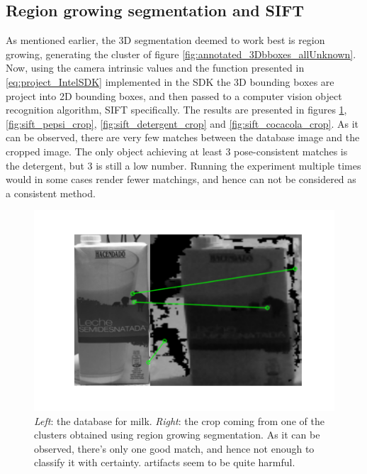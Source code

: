 \documentclass[../main.tex]{subfiles}
\begin{document}
\subsection{Region growing segmentation and SIFT}
As mentioned earlier, the 3D segmentation deemed to work best is region growing, generating the cluster of figure \ref{fig:annotated_3Dbboxes_allUnknown}. Now, using the camera intrinsic values and the function presented in \ref{eq:project_IntelSDK} implemented in the SDK the 3D bounding boxes are project into 2D bounding boxes, and then passed to a computer vision object recognition algorithm, SIFT specifically. The results are presented in figures \ref{fig:sift_milk_crop}, \ref{fig:sift_pepsi_crop}, \ref{fig:sift_detergent_crop} and \ref{fig:sift_cocacola_crop}. As it can be observed, there are very few matches between the database image and the cropped image. The only object achieving at least 3 pose-consistent matches is the detergent, but 3 is still a low number. Running the experiment multiple times would in some cases render fewer matchings, and hence can not be considered as a consistent method.

\begin{figure}[H]
    \centering
    \includegraphics[width=0.7\linewidth]{images/sift_milk_crop.png}
    \caption{\emph{Left}: the database for milk. \emph{Right}: the crop coming from one of the clusters obtained using region growing segmentation. As it can be observed, there's only one good match, and hence not enough to classify it with certainty. artifacts seem to be quite harmful.}
    \label{fig:sift_milk_crop}
\end{figure}
\end{document}
